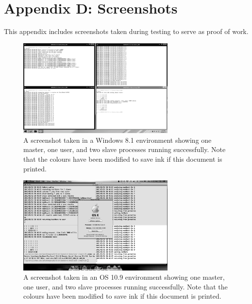 \documentclass[pdftex,12pt,a4paper]{article}
\begin{document}
%
%
\pagebreak
\section{Appendix D: Screenshots}

This appendix includes screenshots taken during testing to serve as proof of work.

\begin{figure}[h]
\begin{center}
\includegraphics[width=0.7\textwidth]{img/win8}
\caption{A screenshot taken in a Windows 8.1 environment showing one master, one user, and two slave processes running successfully. Note that the colours have been modified to save ink if this document is printed.}
\label{fig:win8}
\end{center}
\end{figure}

\begin{figure}[h]
\begin{center}
\includegraphics[width=0.7\textwidth]{img/osx}
\caption{A screenshot taken in an OS 10.9 environment showing one master, one user, and two slave processes running successfully. Note that the colours have been modified to save ink if this document is printed.}
\label{fig:osx}
\end{center}
\end{figure}
\end{document}
